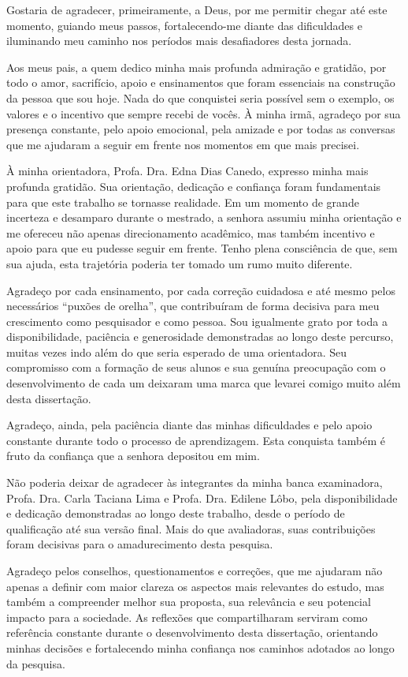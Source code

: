 Gostaria de agradecer, primeiramente, a Deus, por me permitir chegar até este momento, guiando meus passos, fortalecendo-me diante das dificuldades e iluminando meu caminho nos períodos mais desafiadores desta jornada.

Aos meus pais, a quem dedico minha mais profunda admiração e gratidão, por todo o amor, sacrifício, apoio e ensinamentos que foram essenciais na construção da pessoa que sou hoje. Nada do que conquistei seria possível sem o exemplo, os valores e o incentivo que sempre recebi de vocês. À minha irmã, agradeço por sua presença constante, pelo apoio emocional, pela amizade e por todas as conversas que me ajudaram a seguir em frente nos momentos em que mais precisei.

À minha orientadora, Profa. Dra. Edna Dias Canedo, expresso minha mais profunda gratidão. Sua orientação, dedicação e confiança foram fundamentais para que este trabalho se tornasse realidade. Em um momento de grande incerteza e desamparo durante o mestrado, a senhora assumiu minha orientação e me ofereceu não apenas direcionamento acadêmico, mas também incentivo e apoio para que eu pudesse seguir em frente. Tenho plena consciência de que, sem sua ajuda, esta trajetória poderia ter tomado um rumo muito diferente.

Agradeço por cada ensinamento, por cada correção cuidadosa e até mesmo pelos necessários ``puxões de orelha'', que contribuíram de forma decisiva para meu crescimento como pesquisador e como pessoa. Sou igualmente grato por toda a disponibilidade, paciência e generosidade demonstradas ao longo deste percurso, muitas vezes indo além do que seria esperado de uma orientadora. Seu compromisso com a formação de seus alunos e sua genuína preocupação com o desenvolvimento de cada um deixaram uma marca que levarei comigo muito além desta dissertação.

Agradeço, ainda, pela paciência diante das minhas dificuldades e pelo apoio constante durante todo o processo de aprendizagem. Esta conquista também é fruto da confiança que a senhora depositou em mim.

Não poderia deixar de agradecer às integrantes da minha banca examinadora, Profa. Dra. Carla Taciana Lima e Profa. Dra. Edilene Lôbo, pela disponibilidade e dedicação demonstradas ao longo deste trabalho, desde o período de qualificação até sua versão final. Mais do que avaliadoras, suas contribuições foram decisivas para o amadurecimento desta pesquisa.

Agradeço pelos conselhos, questionamentos e correções, que me ajudaram não apenas a definir com maior clareza os aspectos mais relevantes do estudo, mas também a compreender melhor sua proposta, sua relevância e seu potencial impacto para a sociedade. As reflexões que compartilharam serviram como referência constante durante o desenvolvimento desta dissertação, orientando minhas decisões e fortalecendo minha confiança nos caminhos adotados ao longo da pesquisa.

